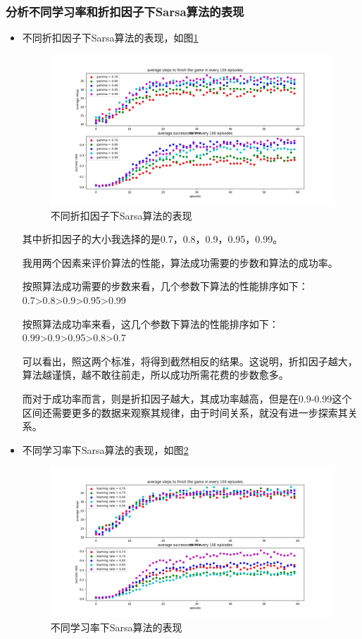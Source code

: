 \documentclass{article}
\begin{document}
\subsubsection*{分析不同学习率和折扣因子下Sarsa算法的表现}
\begin{itemize}
\item 
不同折扣因子下Sarsa算法的表现，如图\ref{fig:1}
\begin{figure}[htbp]
	\centering
	\includegraphics[scale=0.5]{Img/Sarsa_gamma.png}
	\caption{不同折扣因子下Sarsa算法的表现}\label{fig:1}
\end{figure}

其中折扣因子的大小我选择的是0.7，0.8，0.9，0.95，0.99。

我用两个因素来评价算法的性能，算法成功需要的步数和算法的成功率。

按照算法成功需要的步数来看，几个参数下算法的性能排序如下：0.7>0.8>0.9>0.95>0.99

按照算法成功率来看，这几个参数下算法的性能排序如下：0.99>0.9>0.95>0.8>0.7

可以看出，照这两个标准，将得到截然相反的结果。这说明，折扣因子越大，算法越谨慎，越不敢往前走，所以成功所需花费的步数愈多。

而对于成功率而言，则是折扣因子越大，其成功率越高，但是在0.9-0.99这个区间还需要更多的数据来观察其规律，由于时间关系，就没有进一步探索其关系。

\item
不同学习率下Sarsa算法的表现，如图\ref{fig:2}
\begin{figure}[htbp]
	\centering
	\includegraphics[scale=0.5]{Img/Sarsa_lr.png}
	\caption{不同学习率下Sarsa算法的表现}\label{fig:2}
\end{figure}


\end{itemize}
\end{document}
